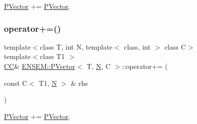 \mbox{\hyperlink{classENSEM_1_1PVector}{P\+Vector}} += \mbox{\hyperlink{classENSEM_1_1PVector}{P\+Vector}}. 

\mbox{\label{classENSEM_1_1PVector_a39e015a8751290105c2960d1607c1ce8}} 
\subsubsection{\texorpdfstring{operator+=()}{operator+=()}\hspace{0.1cm}{\footnotesize\ttfamily [3/3]}}
{\footnotesize\ttfamily template$<$class T, int N, template$<$ class, int $>$ class C$>$ \\
template$<$class T1 $>$ \\
\mbox{\hyperlink{classENSEM_1_1PVector_a92dc0a0a301a3dc96f7be5d337019bc7}{CC}}\& \mbox{\hyperlink{classENSEM_1_1PVector}{E\+N\+S\+E\+M\+::\+P\+Vector}}$<$ T, \mbox{\hyperlink{adat__devel_2lib_2hadron_2operator__name__util_8cc_a7722c8ecbb62d99aee7ce68b1752f337}{N}}, C $>$\+::operator+= (\begin{DoxyParamCaption}\item[{const C$<$ T1, \mbox{\hyperlink{adat__devel_2lib_2hadron_2operator__name__util_8cc_a7722c8ecbb62d99aee7ce68b1752f337}{N}} $>$ \&}]{rhs }\end{DoxyParamCaption})\hspace{0.3cm}{\ttfamily [inline]}}



\mbox{\hyperlink{classENSEM_1_1PVector}{P\+Vector}} += \mbox{\hyperlink{classENSEM_1_1PVector}{P\+Vector}}. 

\mbox{\label{classENSEM_1_1PVector_afe4c144dcca484fed4ee1924d1e387be}} 
